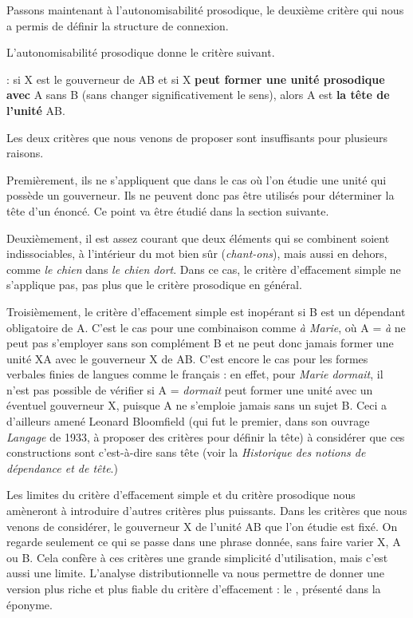 Passons maintenant à l’autonomisabilité prosodique, le deuxième critère qui nous a permis de définir la structure de connexion.

L’autonomisabilité prosodique donne le critère suivant.

\begin{styleLivreImportant}
: si X est le gouverneur de AB et si X \textbf{peut former une unité prosodique avec} A sans B (sans changer significativement le sens), alors A est \textbf{la tête de l’unité} AB.
\end{styleLivreImportant}

Les deux critères que nous venons de proposer sont insuffisants pour plusieurs raisons.

Premièrement, ils ne s’appliquent que dans le cas où l’on étudie une unité qui possède un gouverneur. Ils ne peuvent donc pas être utilisés pour déterminer la tête d’un énoncé. Ce point va être étudié dans la section suivante.

Deuxièmement, il est assez courant que deux éléments qui se combinent soient indissociables, à l’intérieur du mot bien sûr (\textit{chant-ons}), mais aussi en dehors, comme \textit{le chien} dans \textit{le chien dort}. Dans ce cas, le critère d’effacement simple ne s’applique pas, pas plus que le critère prosodique en général.

Troisièmement, le critère d’effacement simple est inopérant si B est un dépendant obligatoire de A. C’est le cas pour une combinaison comme \textit{à Marie}, où A = \textit{à} ne peut pas s’employer sans son complément B et ne peut donc jamais former une unité XA avec le gouverneur X de AB. C’est encore le cas pour les formes verbales finies de langues comme le français : en effet, pour \textit{Marie dormait}, il n’est pas possible de vérifier si A = \textit{dormait} peut former une unité avec un éventuel gouverneur X, puisque A ne s’emploie jamais sans un sujet B. Ceci a d’ailleurs amené Leonard Bloomfield (qui fut le premier, dans son ouvrage \textit{Langage} de 1933, à proposer des critères pour définir la tête) à considérer que ces constructions sont  c’est-à-dire sans tête (voir la  \textit{Historique des notions de dépendance et de tête}.)

Les limites du critère d’effacement simple et du critère prosodique nous amèneront à introduire d’autres critères plus puissants. Dans les critères que nous venons de considérer, le gouverneur X de l’unité AB que l’on étudie est fixé. On regarde seulement ce qui se passe dans une phrase donnée, sans faire varier X, A ou B. Cela confère à ces critères une grande simplicité d’utilisation, mais c’est aussi une limite. L’analyse distributionnelle va nous permettre de donner une version plus riche et plus fiable du critère d’effacement : le , présenté dans la  éponyme.

